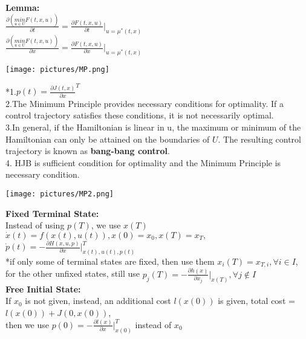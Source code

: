 \documentclass[10pt,landscape]{article}
\newenvironment{Figure}
{\par\medskip\noindent\minipage{\linewidth}}
{\endminipage\par\medskip}
\begin{document}
\begin{multicols*}{4}
\textbf{Lemma:}\\
$\frac{\partial (\underset{u\in U}{min} F(t,x,u))}{\partial t} = \frac{\partial F(t,x,u)}{\partial t}|_{u=\mu^{*}(t,x)}$\\
$\frac{\partial (\underset{u\in U}{min} F(t,x,u))}{\partial x} = \frac{\partial F(t,x,u)}{\partial x}|_{u=\mu^{*}(t,x)}$\\

\begin{Figure}
	\centering
	\texttt{[image: pictures/MP.png]}
\end{Figure}
*1.$p(t) = \frac{\partial J(t,x)}{\partial x}^T $\\

2.The Minimum Principle provides necessary conditions for optimality. If a
control trajectory satisfies these conditions, it is not necessarily optimal.
\\

3.In general, if the Hamiltonian is linear in u, the maximum or minimum of the
Hamiltonian can only be attained on the boundaries of $U$. The resulting control trajectory is known as \textbf{bang-bang control}.\\

4. HJB is sufficient condition for optimality and the Minimum Principle is necessary condition.\\

\begin{Figure}
	\centering
	\texttt{[image: pictures/MP2.png]}
\end{Figure}


\textbf{Fixed Terminal State:}\\
Instead of using $p(T)$, we use $x(T)$\\
$\dot{x}(t) = f(x(t),u(t)), x(0)=x_0, x(T)=x_T,$ \\
$ \dot{p}(t) = - \frac{\partial H(x,u,p)}{\partial x}|^T_{x(t),u(t),p(t)}$\\
*if only some of terminal states are fixed, then use them $x_i(T) = x_{T,i} , \forall i \in I$, for the other unfixed states, still use $p_j(T) = - \frac{\partial h(x)}{\partial x_j}|_{x(T)}, \forall j \notin I$\\

\textbf{Free Initial State:}\\
If $x_0$ is not given, instead, an additional cost $l(x(0))$ is given, total cost = $l(x(0)) + J(0,x(0))$, \\
then we use $p(0) = -\frac{\partial l(x)}{\partial x}|^T_{x(0)} $ instead of  $x_0$\\


\end{multicols*}
\end{document}
